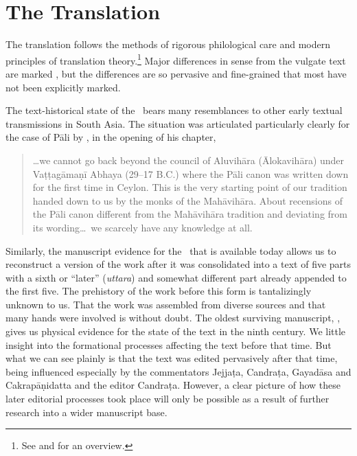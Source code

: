     
\section{The Translation}    
The translation follows the methods of rigorous philological care and
modern principles of translation theory.\footnote{See
    \cite[intro.]{wuja-2003} and \cite[81--83]{wuja-2021} for an
    overview.}  Major differences in sense from the vulgate text are
    marked  , but the differences are so pervasive
    and fine-grained that most have not been explicitly marked.

The text-historical state of the \SS\ bears many resemblances to other early 
textual transmissions in South Asia.  The situation was articulated particularly 
clearly for the case of Pāli by \citet{hinu-1978}, in the opening of his chapter, 
\begin{quote}
    \ldots we cannot go back beyond the council of Aluvihāra (Ālokavihāra) under 
    Vaṭṭagāmaṇī Abhaya (29--17 B.C.) where the Pāli canon was written down for 
    the first time in Ceylon.  This is the very starting point of our tradition 
    handed down to us by the monks of the Mahāvihāra.  About recensions of 
    the Pāli canon different from the Mahāvihāra tradition and deviating from its 
    wording\ldots\ we scarcely have any knowledge at all.
\end{quote}
Similarly, the manuscript evidence for the \SS\ that is available
today allows us to reconstruct a version of the work after it was
consolidated into a text of five parts with a sixth or “later”
(\emph{uttara}) and somewhat different part already appended to the
first five.  The prehistory of the work before this form is
tantalizingly unknown to us.  That the work was assembled from diverse
sources and that many hands were involved is without doubt. The oldest
surviving manuscript, , gives us physical
evidence for the state of the text in the ninth century.  We little
insight into the formational processes affecting the text before that
time.  But what we can see plainly is that the text was edited
pervasively after that time, being influenced especially by the
commentators Jejjaṭa, Candraṭa, Gayadāsa and Cakrapāṇidatta and the
editor Candraṭa. However, a clear picture of how these later editorial
processes took place will only be possible as a result of further
research into a wider manuscript base.